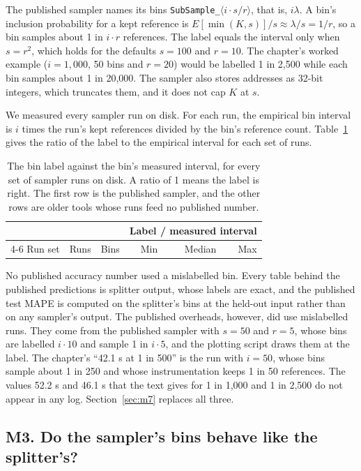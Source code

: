 \documentclass[11pt]{article}
\newcommand{\tabinput}[1]{}
\begin{document}
The published sampler names its bins \texttt{SubSample\_}$\langle i \cdot s / r\rangle$, that is, $i\lambda$. A
bin's inclusion probability for a kept reference is $E[\min(K, s)]/s \approx \lambda/s = 1/r$, so a bin samples
about 1 in $i \cdot r$ references. The label equals the interval only when $s = r^2$, which holds for the defaults
$s=100$ and $r=10$. The chapter's worked example ($i = 1{,}000$, 50 bins and $r = 20$) would be labelled
1 in 2,500 while each bin samples about 1 in 20,000. The sampler also stores addresses as 32-bit integers, which
truncates them, and it does not cap $K$ at $s$.

We measured every sampler run on disk. For each run, the empirical bin interval is $i$ times the run's kept
references divided by the bin's reference count. Table~\ref{tab:m2} gives the ratio of the label to the empirical
interval for each set of runs.

\begin{table}[htbp]
\centering
\caption{The bin label against the bin's measured interval, for every set of sampler runs on disk. A ratio of 1
means the label is right. The first row is the published sampler, and the other rows are older tools whose runs feed
no published number.}
\label{tab:m2}
\small
\begin{tabular}{@{}lrlrrr@{}}
\toprule
& & & \multicolumn{3}{c}{Label / measured interval} \\
\cmidrule(l){4-6}
Run set & Runs & Bins & Min & Median & Max \\
\midrule
\tabinput{m2}
\bottomrule
\end{tabular}
\end{table}

No published accuracy number used a mislabelled bin. Every table behind the published predictions is splitter
output, whose labels are exact, and the published test MAPE is computed on the splitter's bins at the held-out
input rather than on any sampler's output. The published overheads, however, did use mislabelled runs. They come
from the published sampler with $s=50$ and $r=5$, whose bins are labelled $i \cdot 10$ and sample 1 in $i \cdot 5$,
and the plotting script draws them at the label. The chapter's ``42.1 s at 1 in 500'' is the run with $i = 50$,
whose bins sample about 1 in 250 and whose instrumentation keeps 1 in 50 references. The values 52.2 s and 46.1 s
that the text gives for 1 in 1,000 and 1 in 2,500 do not appear in any log. Section~\ref{sec:m7} replaces all three.

\subsection{M3. Do the sampler's bins behave like the splitter's?}
\label{sec:m3}
\end{document}
